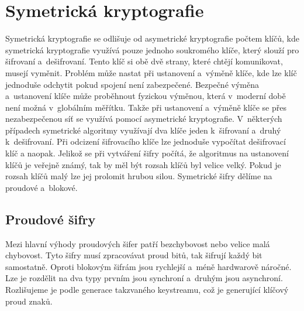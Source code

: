 \section{Symetrická kryptografie}
Symetrická kryptografie se odlišuje od asymetrické kryptografie počtem klíčů, kde symetrická kryptografie využívá pouze jednoho soukromého klíče, který slouží pro šifrovaní a~dešifrovaní. Tento klíč si obě dvě strany, které chtějí komunikovat, musejí vyměnit. Problém může nastat při ustanovení a~výměně klíče, kde lze klíč jednoduše odchytit pokud spojení není zabezpečené. Bezpečné výměna a~ustanovení klíče může proběhnout fyzickou výměnou, která v~moderní době není možná v~globálním měřítku. Takže při ustanovení a~výměně klíče se přes nezabezpečenou síť se využívá pomocí asymetrické kryptografie. V~některých případech symetrické algoritmy využívají dva klíče jeden k~šifrovaní a~druhý k~dešifrovaní. Při odcizení šifrovacího klíče lze jednoduše vypočítat dešifrovací klíč a naopak. Jelikož se při vytváření šifry počítá, že algoritmus na ustanovení klíčů je veřejně známý, tak by měl být rozsah klíčů byl velice velký. Pokud je rozsah klíčů malý lze jej prolomit hrubou silou. Symetrické šifry dělíme na proudové a~blokové.\cite{Nigel9780077099879ISBN}
\subsection{Proudové šifry\label{subsec:streamFunction}}%
Mezi hlavní výhody proudových šifer patří bezchybovost nebo velice malá chybovost. Tyto šifry musí zpracovávat proud bitů, tak šifrují každý bit samostatně. Oproti blokovým šifrám jsou rychlejší a~méně hardwarově náročné. Lze je rozdělit na dva typy prvním jsou synchroní a~druhým jsou asynchroní. Rozlišujeme je podle generace takzvaného keystreamu, což je generující klíčový proud znaků.\cite{HavlicekBakalarka}

